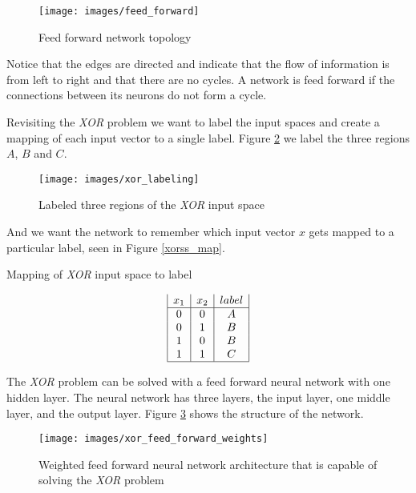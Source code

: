 \begin{figure}[h!]
  \centering
  \texttt{[image: images/feed\_forward]}
  \caption{Feed forward network topology}
  \label{ff}
\end{figure}

Notice that the edges are directed and indicate that the flow of information is from left to right and that there are no cycles.
A network is feed forward if the connections between its neurons do not form a cycle.

Revisiting the {\it XOR} problem we want to label the input spaces
and create a mapping of each input vector to a single label.
Figure \ref{xor_label} we label the three regions $A$, $B$ and $C$.

\begin{figure}[h!]
  \centering
  \texttt{[image: images/xor\_labeling]}
  \caption{Labeled three regions of the {\it XOR} input space}
  \label{xor_label}
\end{figure}

And we want the network to remember which input vector $x$ gets mapped to a
particular label, seen in Figure \ref{xorss_map}.

\begin{table}[h!]
\caption{Mapping of {\it XOR} input space to label}
\label{xorss_map}
\begin{displaymath}
\begin{array}{|c|c|c|}
   x_1
 & x_2
 & label
\\
\hline
0 & 0 & A\\
0 & 1 & B\\
1 & 0 & B\\
1 & 1 & C\\
\hline
\end{array}
\end{displaymath}
\end{table}

The {\it XOR} problem can be solved with a feed forward neural network with
one hidden layer.
The neural network has three layers, the input layer, one middle
layer, and the output layer.
Figure \ref{xffw} shows the structure of the
network.

\begin{figure}[h!]
  \centering
  \texttt{[image: images/xor\_feed\_forward\_weights]}
  \caption{Weighted feed forward neural network architecture that is
    capable of solving the {\it XOR}
    problem}
  \label{xffw}
\end{figure}


